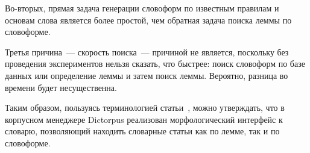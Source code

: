 Во-вторых, прямая задача генерации словоформ по известным правилам и основам слова является более простой, чем обратная задача поиска леммы по словоформе.

Третья причина~--- скорость поиска~--- причиной не является, 
поскольку без проведения экспериментов нельзя сказать, что быстрее: 
поиск словоформ по базе данных или определение леммы и затем поиск леммы. 
Вероятно, разница во времени будет несущественна.

Таким образом, пользуясь терминологией статьи~\cite{morphoAPI2dict2004Maxwell}, 
можно утверждать, что в корпусном менеджере Dictorpus 
реализован морфологический интерфейс к словарю, 
позволяющий находить словарные статьи как по лемме, так и по словоформе.

